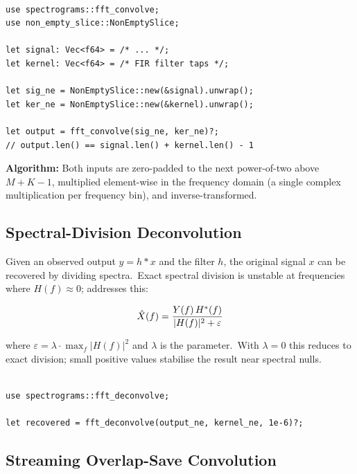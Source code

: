 \begin{lstlisting}[caption={FFT linear convolution with NonEmptySlice input}]

use spectrograms::fft_convolve;
use non_empty_slice::NonEmptySlice;

let signal: Vec<f64> = /* ... */;
let kernel: Vec<f64> = /* FIR filter taps */;

let sig_ne = NonEmptySlice::new(&signal).unwrap();
let ker_ne = NonEmptySlice::new(&kernel).unwrap();

let output = fft_convolve(sig_ne, ker_ne)?;
// output.len() == signal.len() + kernel.len() - 1
\end{lstlisting}

\textbf{Algorithm:} Both inputs are zero-padded to the next
power-of-two above $M + K - 1$, multiplied element-wise in the
frequency domain (a single complex multiplication per frequency bin),
and inverse-transformed.

\subsection{Spectral-Division Deconvolution}\label{subsec:fft_deconvolve}

Given an observed output $y = h \ast x$ and the filter $h$, the
original signal $x$ can be recovered by dividing spectra.\ Exact
spectral division is unstable at frequencies where $H(f) \approx 0$;
 addresses this:

\begin{equation}
  \hat{X}(f) = \frac{Y(f)\, H^*(f)}{|H(f)|^2 + \varepsilon}
\end{equation}

where $\varepsilon = \lambda \cdot \max_f |H(f)|^2$ and $\lambda$ is
the  parameter.\ With $\lambda = 0$ this reduces
to exact division; small positive values stabilise the result near
spectral nulls.

\begin{lstlisting}[caption={Regularised spectral deconvolution}]

use spectrograms::fft_deconvolve;

let recovered = fft_deconvolve(output_ne, kernel_ne, 1e-6)?;
\end{lstlisting}

\subsection{Streaming Overlap-Save Convolution}\label{subsec:overlap_save}

